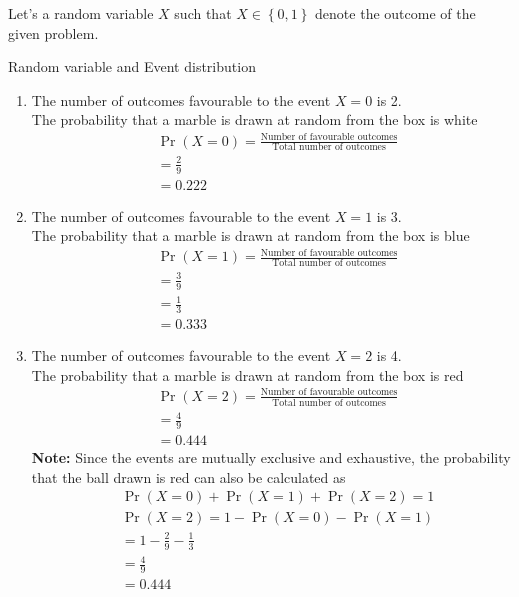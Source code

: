 \documentclass[journal,12pt,twocolumn]{IEEEtran}
\providecommand{\pr}[1]{\ensuremath{\Pr\left(#1\right)}}
\providecommand{\cbrak}[1]{\ensuremath{\left\{#1\right\}}}
\newcommand{\note}{\noindent \textbf{Note: }}
\begin{document}
Let's a random variable $X$ such that $X\in \cbrak{0,1}$ denote the outcome of the given problem. 
\begin{table}[H]

	\caption{Random variable and Event distribution}
	\label{tab1}
\end{table}
\begin{enumerate}[label=(\roman{enumi})]
      \item The number of outcomes favourable to the event $X=0$ is 2.\\
      The probability that a marble is drawn at random from the box is white
\begin{align}
	 &\pr{X=0} = \frac{\text{Number of favourable outcomes}}{\text{Total number of outcomes}}\\
	 &=\frac{2}{9}\\
	 &=0.222
\end{align}
      \item The number of outcomes favourable to the event $X=1$ is 3.\\ 
      The probability that a marble is drawn at random from the box is blue
\begin{align}
	 &\pr{X=1} = \frac{\text{Number of favourable outcomes}}{\text{Total number of outcomes}}\\
	 &=\frac{3}{9}\\
	 &=\frac{1}{3}\\
	 &=0.333
\end{align}
      \item The number of outcomes favourable to the event $X=2$ is 4.\\
      The probability that a marble is drawn at random from the box is red
\begin{align}
	 &\pr{X=2} = \frac{\text{Number of favourable outcomes}}{\text{Total number of outcomes}}\\
	 &=\frac{4}{9}\\
	 &=0.444
\end{align}
\note  Since the events are mutually exclusive and exhaustive, the probability that the ball drawn is red can also be calculated as
\begin{align}
	&\pr{X=0}+\pr{X=1}+\pr{X=2}=1\\
    &\pr{X=2}=1-\pr{X=0}-\pr{X=1}\\
    &= 1-\frac{2}{9}-\frac{1}{3}\\
    &=\frac{4}{9}\\
    &=0.444
    \end{align}
\end{enumerate}
\end{document}
